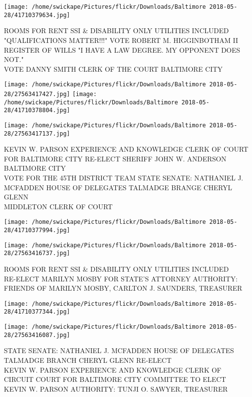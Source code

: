 \documentclass[10pt,letterpaper]{article}
\begin{document}
\vspace{0.25in}
\texttt{[image: /home/swickape/Pictures/flickr/Downloads/Baltimore 2018-05-28/41710379634.jpg]}

ROOMS FOR RENT SSI \& DISABILITY ONLY UTILITIES INCLUDED\\
"QUALIFICATIONS MATTER!!!" VOTE ROBERT M. HIGGINBOTHAM II REGISTER OF WILLS "I HAVE A LAW DEGREE.  MY OPPONENT DOES NOT."\\
VOTE DANNY SMITH CLERK OF THE COURT BALTIMORE CITY
\pagebreak

\texttt{[image: /home/swickape/Pictures/flickr/Downloads/Baltimore 2018-05-28/27563417427.jpg]}
\texttt{[image: /home/swickape/Pictures/flickr/Downloads/Baltimore 2018-05-28/41710378804.jpg]}

\vspace{0.25in}
\texttt{[image: /home/swickape/Pictures/flickr/Downloads/Baltimore 2018-05-28/27563417137.jpg]}

KEVIN W. PARSON EXPERIENCE AND KNOWLEDGE CLERK OF COURT FOR BALTIMORE CITY RE{-}ELECT SHERIFF JOHN W. ANDERSON BALTIMORE CITY\\
VOTE FOR THE 45TH DISTRICT TEAM STATE SENATE: NATHANIEL J. MCFADDEN HOUSE OF DELEGATES TALMADGE BRANGE CHERYL GLENN\\
MIDDLETON CLERK OF COURT
\pagebreak

\texttt{[image: /home/swickape/Pictures/flickr/Downloads/Baltimore 2018-05-28/41710377994.jpg]}

\vspace{0.25in}
\texttt{[image: /home/swickape/Pictures/flickr/Downloads/Baltimore 2018-05-28/27563416737.jpg]}

ROOMS FOR RENT SSI \& DISABILITY ONLY UTILITIES INCLUDED\\
RE{-}ELECT MARILYN MOSBY FOR STATE'S ATTORNEY AUTHORITY: FRIENDS OF MARILYN MOSBY, CARLTON J. SAUNDERS, TREASURER
\pagebreak

\texttt{[image: /home/swickape/Pictures/flickr/Downloads/Baltimore 2018-05-28/41710377344.jpg]}

\vspace{0.25in}
\texttt{[image: /home/swickape/Pictures/flickr/Downloads/Baltimore 2018-05-28/27563416087.jpg]}

STATE SENATE: NATHANIEL J. MCFADDEN HOUSE OF DELEGATES TALMADGE BRANCH CHERYL GLENN RE{-}ELECT\\
KEVIN W. PARSON EXPERIENCE AND KNOWLEDGE CLERK OF CIRCUIT COURT FOR BALTIMORE CITY COMMITTEE TO ELECT KEVIN W. PARSON AUTHORITY: TUNJI O. SAWYER, TREASURER
\pagebreak
\end{document}
